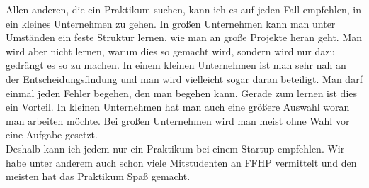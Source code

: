 Allen anderen, die ein Praktikum suchen, kann ich es auf jeden Fall empfehlen, in ein kleines Unternehmen zu gehen. In großen Unternehmen kann man unter Umständen ein feste Struktur lernen, wie man an große Projekte heran geht. Man wird aber nicht lernen, warum dies so gemacht wird, sondern wird nur dazu gedrängt es so zu machen. In einem kleinen Unternehmen ist man sehr nah an der Entscheidungsfindung und man wird vielleicht sogar daran beteiligt. Man darf einmal jeden Fehler begehen, den man begehen kann. Gerade zum lernen ist dies ein Vorteil. In kleinen Unternehmen hat man auch eine größere Auswahl woran man arbeiten möchte. Bei großen Unternehmen wird man meist ohne Wahl vor eine Aufgabe gesetzt.\\

Deshalb kann ich jedem nur ein Praktikum bei einem Startup empfehlen. Wir habe unter anderem auch schon viele Mitstudenten an FFHP vermittelt und den meisten hat das Praktikum Spaß gemacht.

